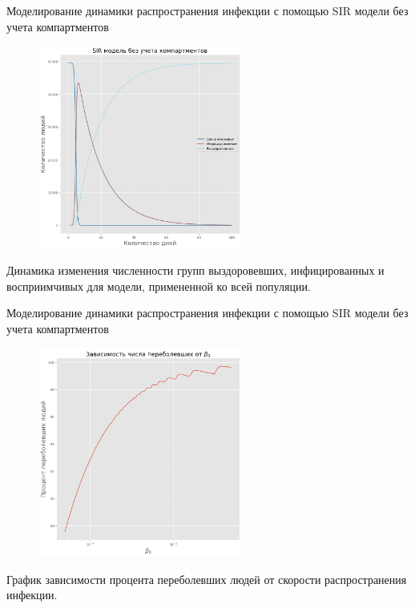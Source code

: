 \documentclass[10pt, unicode, xcolor={svgnames, table, hyperref}]{beamer}
\begin{document}
\begin{frame}{Моделирование динамики распространения инфекции с помощью SIR модели без учета компартментов}
	
	\begin{figure}[h!]
		\includegraphics[width=0.6\textwidth]{img/sir_to_all.png}
	\end{figure}
	Динамика изменения численности групп выздоровевших, инфицированных и восприимчивых для модели,	примененной ко всей популяции.
\end{frame}


\begin{frame}{Моделирование динамики распространения инфекции с помощью SIR модели без учета компартментов}
	
	\begin{figure}[h!]
		\includegraphics[width=0.6\textwidth]{img/sir_beta.png}
	\end{figure}
	График зависимости процента переболевших людей от скорости распространения инфекции.
	
\end{frame}
\end{document}
